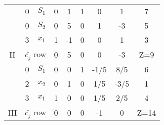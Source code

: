 \documentclass[../main-sheet.tex]{subfiles}
\begin{document}
\begin{soln}
\begin{table}[H]
\begin{tabular}{ccccccccc}
                                  & 0                                     & \(S_1\)                                        & 0                          & \cellcolor[HTML]{FFCCC9}1  & 1                         & 0                            & 1                            & 7         \\
                                  & 0                                     & \(S_2\)                                        & \cellcolor[HTML]{9AFF99}0  & \cellcolor[HTML]{96FFFB}5  & \cellcolor[HTML]{9AFF99}0 & \cellcolor[HTML]{9AFF99}1    & \cellcolor[HTML]{9AFF99}-3   & 5         \\
                                  & 3                                     & \(x_1\)                                        & 1                          & \cellcolor[HTML]{FFCCC9}-1 & 0                         & 0                            & 1                            & 3         \\ \cmidrule(l){2-9}
            \multirow{-4}{*}{II}  & \multicolumn{2}{c}{\(\bar{c_j}\) row} & 0                                              & 5                          & 0                          & 0                         & -3                           & Z=9                                      \\ \midrule
                                  & 0                                     & \(S_1\)                                        & \cellcolor[HTML]{9AFF99}0  & \cellcolor[HTML]{9AFF99}0  & \cellcolor[HTML]{9AFF99}1 & \cellcolor[HTML]{9AFF99}-1/5 & \cellcolor[HTML]{96FFFB}8/5  & 6         \\
                                  & 2                                     & \(x_2\)                                        & 0                          & 1                          & 0                         & 1/5                          & \cellcolor[HTML]{FFCCC9}-3/5 & 1         \\
                                  & 3                                     & \(x_1\)                                        & 1                          & 0                          & 0                         & 1/5                          & \cellcolor[HTML]{FFCCC9}2/5  & 4         \\ \cmidrule(l){2-9}
            \multirow{-4}{*}{III} & \multicolumn{2}{c}{\(\bar{c_j}\) row} & 0                                              & 0                          & 0                          & -1                        & 0                            & Z=14                                     \\ \midrule

\end{tabular}
\end{table}
\end{soln}
\end{document}

